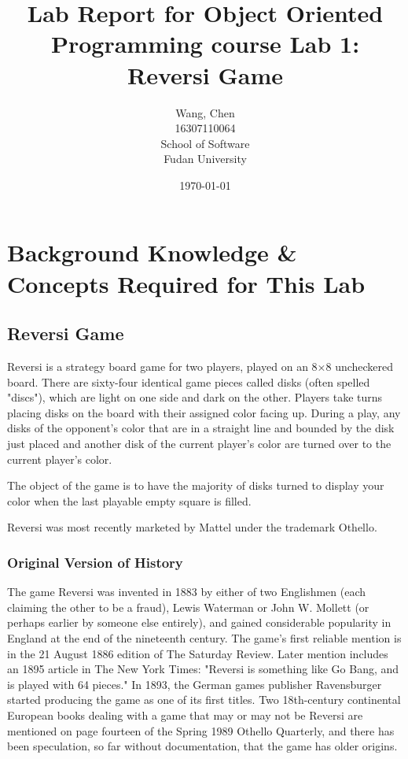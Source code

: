 \documentclass[a4paper]{report}
\title{Lab Report for Object Oriented Programming course \newline
 Lab 1: Reversi Game}
\author{Wang, Chen \\ 16307110064 \\ School of Software\\ Fudan University}
\date{\today}
\begin{document}
\maketitle

\tableofcontents

\chapter{Background Knowledge \& Concepts Required for This Lab}
\section{Reversi Game}
Reversi is a strategy board game for two players, played on an 8×8 uncheckered board. There are sixty-four identical game pieces called disks (often spelled "discs"), which are light on one side and dark on the other. Players take turns placing disks on the board with their assigned color facing up. During a play, any disks of the opponent's color that are in a straight line and bounded by the disk just placed and another disk of the current player's color are turned over to the current player's color. 
\par
The object of the game is to have the majority of disks turned to display your color when the last playable empty square is filled. 
\par
Reversi was most recently marketed by Mattel under the trademark Othello. 

\subsection{Original Version of History}
The game Reversi was invented in 1883 by either of two Englishmen (each claiming the other to be a fraud), Lewis Waterman or John W. Mollett (or perhaps earlier by someone else entirely), and gained considerable popularity in England at the end of the nineteenth century. The game's first reliable mention is in the 21 August 1886 edition of The Saturday Review. Later mention includes an 1895 article in The New York Times: "Reversi is something like Go Bang, and is played with 64 pieces." In 1893, the German games publisher Ravensburger started producing the game as one of its first titles. Two 18th-century continental European books dealing with a game that may or may not be Reversi are mentioned on page fourteen of the Spring 1989 Othello Quarterly, and there has been speculation, so far without documentation, that the game has older origins.
\end{document}
